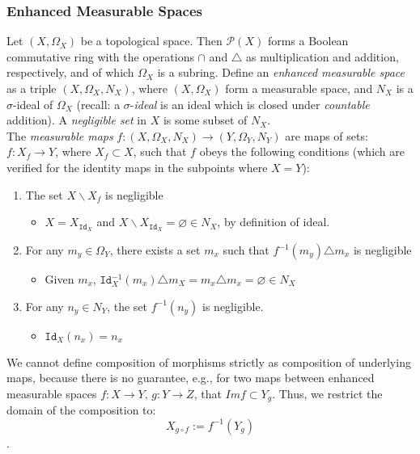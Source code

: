 \documentclass{article}
\begin{document}
	\subsubsection{Enhanced Measurable Spaces}
	Let $(X,\Omega_X)$ be a topological space.  Then $\mathcal{P}(X)$ forms a Boolean commutative ring with the operations $\cap$ and $\triangle$ as multiplication and addition, respectively, and of which $\Omega_X$ is a subring.
	Define an \textit{enhanced measurable space} as a triple $(X,\Omega_X,N_X)$, where $(X,\Omega_X)$ form a measurable space, and $N_X$ is a $\sigma$-ideal of $\Omega_{X}$ (recall: a $\sigma$-\textit{ideal} is an ideal which is closed under \textit{countable} addition).  A \textit{negligible set} in $X$ is some subset of $N_{X}$.\\The \textit{measurable maps} $f: (X,\Omega_X, N_X)\rightarrow(Y,\Omega_Y,N_Y)$ are maps of sets: $f: X_f\rightarrow{}Y$, where $X_f\subset{}X$, such that $f$ obeys the following conditions (which are verified for the identity maps in the subpoints where $X=Y$):
	\begin{enumerate}
		\item The set $X\backslash{}X_f$ is negligible
		\begin{itemize}\item $X=X_{\texttt{Id}_X}$ and $X\backslash{}X_{\texttt{Id}_X}=\varnothing\in{}N_X$, by definition of ideal. \end{itemize}
		\item For any $m_{y}\in\Omega_Y$, there exists a set $m_{x}$ such that $f^{-1}(m_y)\triangle{}m_x$ is negligible
		\begin{itemize}\item Given $m_{x}$, $\texttt{Id}^{-1}_X(m_x)\triangle{}m_X = m_x\triangle{}m_x = \varnothing\in{}N_X$ \end{itemize}
		\item For any $n_y\in N_Y$, the set $f^{-1}(n_y)$ is negligible.
		\begin{itemize} \item $\texttt{Id}_X(n_x) = n_x$ \end{itemize}
	\end{enumerate}
	We cannot define composition of morphisms strictly as composition of underlying maps, because there is no guarantee, e.g., for two maps between enhanced measurable spaces $f:X\rightarrow{}Y,\,g:Y\rightarrow{}Z$, that $\textit{Im}f\subset{}Y_g$.  Thus, we restrict the domain of the composition to:
	\begin{equation*}
		X_{g\circ{}f} := f^{-1}(Y_g)
	\end{equation*}.
\end{document}

